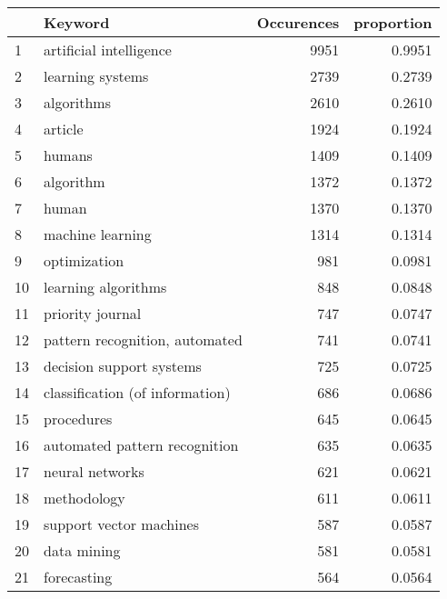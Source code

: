 \begin{tabular}{llrr}
\toprule
{} &                                  Keyword &  Occurences &  proportion \\
\midrule
1  &                  artificial intelligence &        9951 &      0.9951 \\
2  &                         learning systems &        2739 &      0.2739 \\
3  &                               algorithms &        2610 &      0.2610 \\
4  &                                  article &        1924 &      0.1924 \\
5  &                                   humans &        1409 &      0.1409 \\
6  &                                algorithm &        1372 &      0.1372 \\
7  &                                    human &        1370 &      0.1370 \\
8  &                         machine learning &        1314 &      0.1314 \\
9  &                             optimization &         981 &      0.0981 \\
10 &                      learning algorithms &         848 &      0.0848 \\
11 &                         priority journal &         747 &      0.0747 \\
12 &           pattern recognition, automated &         741 &      0.0741 \\
13 &                 decision support systems &         725 &      0.0725 \\
14 &          classification (of information) &         686 &      0.0686 \\
15 &                               procedures &         645 &      0.0645 \\
16 &            automated pattern recognition &         635 &      0.0635 \\
17 &                          neural networks &         621 &      0.0621 \\
18 &                              methodology &         611 &      0.0611 \\
19 &                  support vector machines &         587 &      0.0587 \\
20 &                              data mining &         581 &      0.0581 \\
21 &                              forecasting &         564 &      0.0564 \\

\end{tabular}
